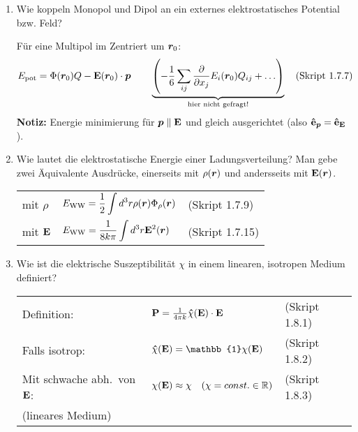 \begin{enumerate}
  \item Wie koppeln Monopol und Dipol an ein externes elektrostatisches %
        Potential bzw. Feld?
        
        Für eine Multipol im Zentriert um $\vb* r_0$:
        $$E_{\text{pot}}=\Phi(\vb* r_0)Q-\vb E(\vb* r_0)\cdot\vb* p 
        \qquad
        \underbrace{\qty(-\frac{1}{6}\sum_{ij}\pdv{x_j}E_i(\vb* r_0)Q_{ij}
        +\ldots)}_{\text{hier nicht gefragt!}}
        \quad\text{(Skript 1.7.7)}$$
        \textbf{Notiz:} Energie minimierung für $\vb* p\parallel \vb E$
        und gleich ausgerichtet (also $\vu e_{\vb* p}=\vu e_{\vb E}$).\\

  \clearpage
  \item Wie lautet die elektrostatische Energie einer Ladungsverteilung? %
        Man gebe zwei Äquivalente Ausdrücke, einerseits mit $\rho(\vb* r)$
        und andersseits mit $\vb E(\vb* r)$.
        \begin{center}
        \begin{tabular}{lll}
          mit $\rho$    & $\displaystyle E_{\text{WW}}=
                          \frac{1}{2}\int d^3 r\rho(\vb* r)
                          \Phi_\rho(\vb* r)$
                            &(Skript 1.7.9)\\
          mit $\vb E$   & $\displaystyle E_{\text{WW}}=\frac{1}{8k\pi}
                           \int d^3 r\vb E^2(\vb* r)$
                            &(Skript 1.7.15)\\
        \end{tabular}
        \end{center}

  \item Wie ist die elektrische Suszeptibilität $\chi$ in einem  %
        linearen, isotropen Medium definiert?
        \begin{center}
        \begin{tabular}{lll}
          Definition:             
          & $\vb P = \frac{1}{4\pi k} 
            \vu \chi(\vb E)\cdot \vb E\quad$
          & (Skript 1.8.1) \\
          Falls isotrop: 
          & $\vu\chi(\vb E)=
            \mathbb{1}\chi(\vb E)$
          & (Skript 1.8.2) \\
          Mit schwache abh.\ von $\vb E$:
          & $\chi(\vb E)\approx\chi
          \quad(\chi=const.\in\mathbb{R})$
            & (Skript 1.8.3) \\
          (lineares Medium)
        \end{tabular}
        \end{center}


\end{enumerate}
